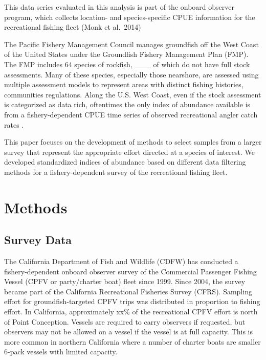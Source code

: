 \documentclass[preprint, 3p,
authoryear]{elsarticle} %
\begin{document}
This data series evaluated in this analysis is part of the onboard
observer program, which collects location- and species-specific CPUE
information for the recreational fishing fleet (Monk et al.~2014)

The Pacific Fishery Management Council manages groundfish off the West
Coast of the United States under the Groundfish Fishery Management Plan
(FMP). The FMP includes 64 species of rockfish, \_\_\_ of which do not
have full stock assessments. Many of these species, especially those
nearshore, are assessed using multiple assessment models to represent
areas with distinct fishing histories, communities regulations. Along
the U.S. West Coast, even if the stock assessment is categorized as data
rich, oftentimes the only index of abundance available is from a
fishery-dependent CPUE time series of observed recreational angler catch
rates \citep{Cope2013}.

This paper focuses on the development of methods to select samples from
a larger survey that represent the appropriate effort directed at a
species of interest. We developed standardized indices of abundance
based on different data filtering methods for a fishery-dependent survey
of the recreational fishing fleet.

\hypertarget{methods}{%
\section{Methods}\label{methods}}

\hypertarget{survey-data}{%
\subsection{Survey Data}\label{survey-data}}

The California Department of Fish and Wildlife (CDFW) has conducted a
fishery-dependent onboard observer survey of the Commercial Passenger
Fishing Vessel (CPFV or party/charter boat) fleet since 1999. Since
2004, the survey became part of the California Recreational Fisheries
Survey (CFRS). Sampling effort for groundfish-targeted CPFV trips was
distributed in proportion to fishing effort. In California,
approximately xx\% of the recreational CPFV effort is north of Point
Conception. Vessels are required to carry observers if requested, but
observers may not be allowed on a vessel if the vessel is at full
capacity. This is more common in northern California where a number of
charter boats are smaller 6-pack vessels with limited capacity.
\end{document}
